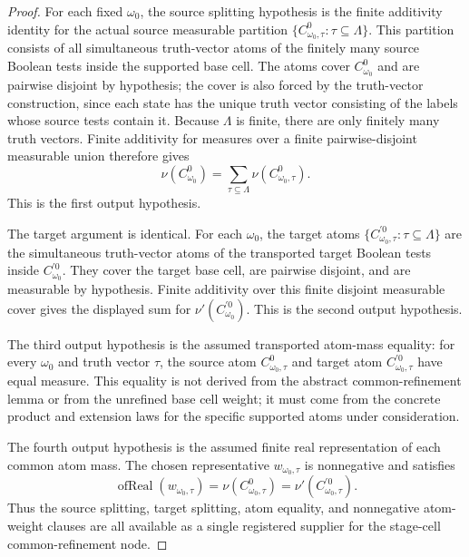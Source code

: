 \begin{proof}
For each fixed \(\omega_0\), the source splitting hypothesis is the finite
additivity identity for the actual source measurable partition
\(\{C^0_{\omega_0,\tau}:\tau\subseteq\Lambda\}\).  This partition consists
of all simultaneous truth-vector atoms of the finitely many source Boolean
tests inside the supported base cell.  The atoms cover \(C^0_{\omega_0}\)
and are pairwise disjoint by hypothesis; the cover is also forced by the
truth-vector construction, since each state has the unique truth vector
consisting of the labels whose source tests contain it.  Because
\(\Lambda\) is finite, there are only finitely many truth vectors.  Finite
additivity for measures over a finite pairwise-disjoint measurable union
therefore gives
\[
\nu(C^0_{\omega_0})
=\sum_{\tau\subseteq\Lambda}\nu(C^0_{\omega_0,\tau}).
\]
This is the first output hypothesis.

The target argument is identical.  For each \(\omega_0\), the target atoms
\(\{C^{\prime0}_{\omega_0,\tau}:\tau\subseteq\Lambda\}\) are the simultaneous
truth-vector atoms of the transported target Boolean tests inside
\(C^{\prime0}_{\omega_0}\).  They cover the target base cell, are pairwise
disjoint, and are measurable by hypothesis.  Finite additivity over this
finite disjoint measurable cover gives the displayed sum for
\(\nu'(C^{\prime0}_{\omega_0})\).  This is the second output hypothesis.

The third output hypothesis is the assumed transported atom-mass equality:
for every \(\omega_0\) and truth vector \(\tau\), the source atom
\(C^0_{\omega_0,\tau}\) and target atom
\(C^{\prime0}_{\omega_0,\tau}\) have equal measure.  This equality is not
derived from the abstract common-refinement lemma or from the unrefined base
cell weight; it must come from the concrete product and extension laws for
the specific supported atoms under consideration.

The fourth output hypothesis is the assumed finite real representation of
each common atom mass.  The chosen representative
\(w_{\omega_0,\tau}\) is nonnegative and satisfies
\[
\operatorname{ofReal}(w_{\omega_0,\tau})
=\nu(C^0_{\omega_0,\tau})
=\nu'(C^{\prime0}_{\omega_0,\tau}).
\]
Thus the source splitting, target splitting, atom equality, and nonnegative
atom-weight clauses are all available as a single registered supplier for
the stage-cell common-refinement node.
\end{proof}
